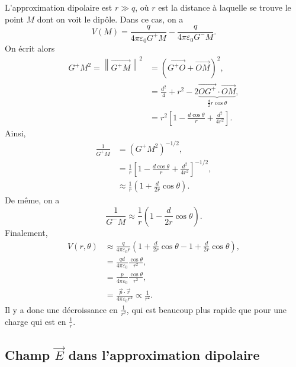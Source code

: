 L'approximation dipolaire est $r\gg q$, où $r$ est la distance à laquelle se trouve le point $M$ dont on voit le dipôle. Dans ce cas, on a 
\begin{equation}
    V(M)=\frac{q}{4\pi\varepsilon_{0}G^{+}M}-\frac{q}{4\pi\varepsilon_{0}G^{-}M}.
\end{equation}
On écrit alors
\begin{align}
    G^{+}M^{2}=\left\lVert \overrightarrow{G^{+}M}\right\rVert^{2}
    &=\left(\overrightarrow{G^{+}O}+\overrightarrow{OM}\right)^{2},\\
    &=\frac{d^{2}}{4}+r^{2}-2\underbrace{\overrightarrow{OG^{+}}\cdot\overrightarrow{OM}}_{\frac{d}{2}r\cos\theta},\\
    &=r^{2}\left[
        1-\frac{d\cos\theta}{r}+\frac{d^{2}}{4r^{2}}
    \right].
\end{align}
Ainsi,
\begin{align}
    \frac{1}{G^{+}M}
    &=(G^{+}M^{2})^{-1/2},\\
    &=\frac{1}{r}\left[1-\frac{d\cos\theta}{r}+\frac{d^{2}}{4r^{2}}\right]^{-1/2},\\
    &\approx\frac{1}{r}\left(1+\frac{d}{2r}\cos\theta\right).
\end{align}
De même, on a 
\begin{equation}
    \frac{1}{G^{-}M}\approx\frac{1}{r}\left(1-\frac{d}{2r}\cos\theta\right).
\end{equation}
Finalement,
\begin{align}
    V(r,\theta)
    &\approx\frac{q}{4\pi\varepsilon_0 r}\left(1+\frac{d}{2r}\cos\theta-1+\frac{d}{2r}\cos\theta\right),\\
    &=\frac{qd}{4\pi\varepsilon_0}\frac{\cos\theta}{r^{2}},\\
    &=\frac{p}{4\pi\varepsilon_0}\frac{\cos\theta}{r^{2}},\\
    &=\frac{\vec{p}\cdot\vec{r}}{4\pi\varepsilon_0 r^{3}}\propto\frac{1}{r^{2}}.
\end{align}
Il  y a donc une décroissance en $\frac{1}{r^{2}}$, qui est beaucoup plus rapide que pour une charge qui est en $\frac{1}{r}$.

\subsection{Champ \texorpdfstring{$\vec{E}$}{E} dans l'approximation dipolaire}

